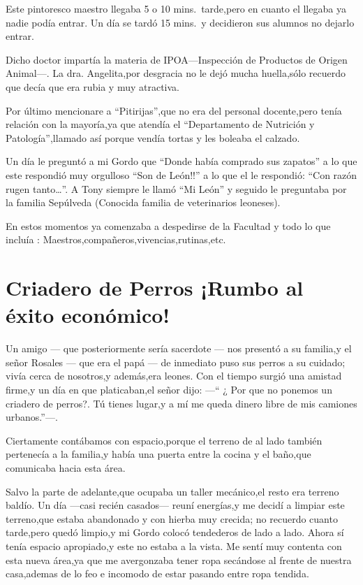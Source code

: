\documentclass[letterpaper,12pt]{book}
\begin{document}
Este pintoresco maestro llegaba 5 o 10 mins.\ tarde,pero en cuanto el llegaba ya nadie podía entrar. Un día se tardó 15 mins.\ y decidieron sus alumnos no dejarlo entrar. 

Dicho doctor impartía la materia de IPOA---Inspección de Productos de Origen Animal---.
La dra. Angelita,por desgracia no le dejó mucha huella,sólo recuerdo que decía que era rubia y muy atractiva. 

Por último mencionare a ``Pitirijas'',que no era del personal docente,pero tenía relación con la mayoría,ya que atendía el ``Departamento de Nutrición y Patología'',llamado así porque vendía tortas y les boleaba el calzado.

Un día le preguntó a mi Gordo que ``Donde había comprado sus zapatos'' a lo que este respondió muy orgulloso ``Son de León!!'' a lo que el le respondió:
``Con razón rugen tanto\ldots''.  A Tony siempre le llamó ``Mi León'' y seguido le preguntaba por la familia Sepúlveda (Conocida familia de veterinarios leoneses).

En estos momentos ya comenzaba a despedirse de la Facultad y todo lo que incluía : Maestros,compañeros,vivencias,rutinas,etc.
\chapter{Criadero de Perros ¡Rumbo al éxito económico!}
Un amigo --- que posteriormente sería sacerdote --- nos presentó a su familia,y el señor Rosales --- que era el papá --- de inmediato puso sus perros a su cuidado; vivía cerca de nosotros,y además,era leones. Con el tiempo surgió una amistad firme,y un día en  que platicaban,el señor dijo: ---`` ¿ Por que no ponemos un criadero de perros?. Tú tienes lugar,y a mí me queda dinero libre de mis camiones urbanos.''---.

Ciertamente contábamos con espacio,porque el terreno de al lado también pertenecía a la familia,y había una puerta entre la cocina y el baño,que comunicaba hacia esta área.

Salvo la parte de adelante,que ocupaba un taller mecánico,el resto era terreno baldío. Un día ---casi recién casados--- reuní energías,y me decidí a limpiar este terreno,que estaba abandonado y con hierba muy crecida; no recuerdo cuanto tarde,pero quedó limpio,y mi Gordo colocó tendederos de lado a lado. Ahora sí tenía espacio apropiado,y este no estaba a la vista. Me sentí muy contenta con esta nueva área,ya que me avergonzaba tener ropa secándose al frente de nuestra casa,ademas de lo feo e incomodo de estar pasando entre ropa tendida.
\end{document}
